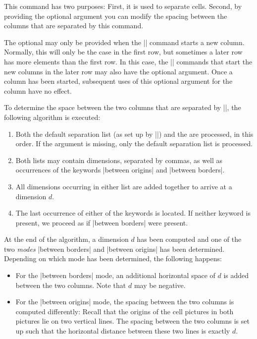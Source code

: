 \begin{command}{\pgfmatrixnextcell{}}
    This command has two purposes: First, it is used to separate cells. Second,
    by providing the optional argument  you can
    modify the spacing between the columns that are separated by this command.

    The optional  may only be provided when the
    |\pgfmatrixnextcell| command starts a new column. Normally, this will only
    be the case in the first row, but sometimes a later row has more elements
    than the first row. In this case, the |\pgfmatrixnextcell| commands that
    start the new columns in the later row may also have the optional argument.
    Once a column has been started, subsequent uses of this optional argument
    for the column have no effect.

    To determine the space between the two columns that are separated by
    |\pgfmatrixnextcell|, the following algorithm is executed:
    \begin{enumerate}
        \item Both the default separation list (as set up by
            |\pgfsetmatrixcolumnsep|) and the  are
            processed, in this order. If the 
            argument is missing, only the default separation list is processed.
        \item Both lists may contain dimensions, separated by commas, as well
            as occurrences of the keywords |between origins| and |between
            borders|.
        \item All dimensions occurring in either list are added together to
            arrive at a dimension $d$.
        \item The last occurrence of either of the keywords is located. If
            neither keyword is present, we proceed as if |between borders| were
            present.
    \end{enumerate}
    At the end of the algorithm, a dimension $d$ has been computed and one of
    the two \emph{modes} |between borders| and |between origins| has been
    determined. Depending on which mode has been determined, the following
    happens:
    \begin{itemize}
        \item For the |between borders| mode, an additional horizontal space of
            $d$ is added between the two columns. Note that $d$ may be
            negative.
        \item For the |between origins| mode, the spacing between the two
            columns is computed differently: Recall that the origins of the
            cell pictures in both pictures lie on two vertical lines. The
            spacing between the two columns is set up such that the horizontal
            distance between these two lines is exactly $d$.


\end{itemize}
\end{command}
